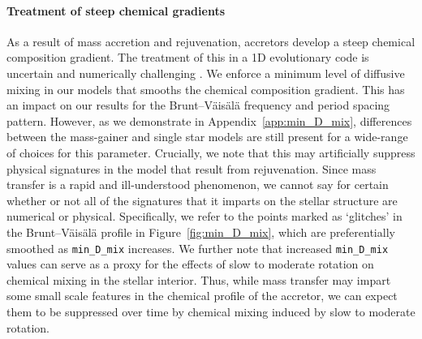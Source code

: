 \documentclass[desactivate]{aa}
\begin{document}
\paragraph{Treatment of steep chemical gradients} As a result of mass accretion and rejuvenation, accretors develop a steep chemical composition gradient. The treatment of this in a 1D evolutionary code is uncertain and numerically challenging \citep[e.g.\ ][]{Lau+2014:2014A&A...570A.125L}. We enforce a minimum level of diffusive mixing in our models that smooths the chemical composition gradient. This has an impact on our results for the Brunt–Väisälä frequency and period spacing pattern. However, as we demonstrate in Appendix~\ref{app:min_D_mix}, differences between the mass-gainer and single star models are still present for a wide-range of choices for this parameter. Crucially, we note that this may artificially suppress physical signatures in the model that result from rejuvenation. Since mass transfer is a rapid and ill-understood phenomenon, we cannot say for certain whether or not all of the signatures that it imparts on the stellar structure are numerical or physical. Specifically, we refer to the points marked as `glitches' in the Brunt–Väisälä profile in Figure~\ref{fig:min_D_mix}, which are preferentially smoothed as \texttt{min\_D\_mix} increases. We further note that increased \texttt{min\_D\_mix} values can serve as a proxy for the effects of slow to moderate rotation on chemical mixing in the stellar interior. Thus, while mass transfer may impart some small scale features in the chemical profile of the accretor, we can expect them to be suppressed over time by chemical mixing induced by slow to moderate rotation.




\end{document}
